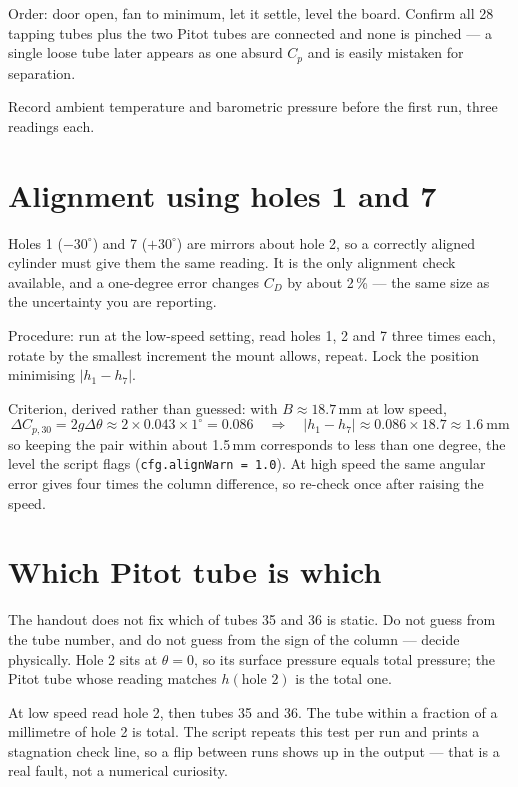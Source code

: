 \documentclass[11pt,a4paper]{article}
\newcommand{\Cp}{\ensuremath{C_p}}
\newcommand{\CD}{\ensuremath{C_D}}
\begin{document}
Order: door open, fan to minimum, let it settle, level the board. Confirm all 28 tapping tubes plus
the two Pitot tubes are connected and none is pinched --- a single loose tube later appears as one
absurd \Cp{} and is easily mistaken for separation.

Record ambient temperature and barometric pressure before the first run, three readings each.

\section{Alignment using holes 1 and 7}

Holes 1 ($-30^\circ$) and 7 ($+30^\circ$) are mirrors about hole 2, so a correctly aligned cylinder
must give them the same reading. It is the only alignment check available, and a one-degree error
changes \CD{} by about 2\,\% --- the same size as the uncertainty you are reporting.

Procedure: run at the low-speed setting, read holes 1, 2 and 7 three times each, rotate by the
smallest increment the mount allows, repeat. Lock the position minimising $|h_1 - h_7|$.

Criterion, derived rather than guessed: with $B \approx 18.7$\,mm at low speed,
\begin{equation}
\Delta C_{p,30} = 2 g \Delta\theta \approx 2 \times 0.043 \times 1^\circ = 0.086
\quad\Rightarrow\quad |h_1 - h_7| \approx 0.086 \times 18.7 \approx 1.6\ \text{mm}
\end{equation}
so keeping the pair within about 1.5\,mm corresponds to less than one degree, the level the script
flags (\texttt{cfg.alignWarn = 1.0}). At high speed the same angular error gives four times the
column difference, so re-check once after raising the speed.

\section{Which Pitot tube is which}

The handout does not fix which of tubes 35 and 36 is static. Do not guess from the tube number,
and do not guess from the sign of the column --- decide physically. Hole 2 sits at $\theta = 0$,
so its surface pressure equals total pressure; the Pitot tube whose reading matches
$h(\text{hole } 2)$ is the total one.

At low speed read hole 2, then tubes 35 and 36. The tube within a fraction of a millimetre of hole 2
is total. The script repeats this test per run and prints a stagnation check line, so a flip between
runs shows up in the output --- that is a real fault, not a numerical curiosity.
\end{document}
